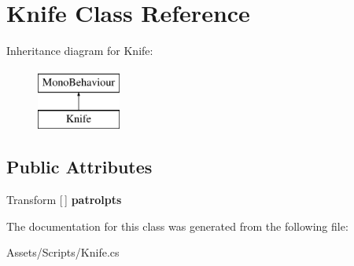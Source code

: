 \hypertarget{class_knife}{}\section{Knife Class Reference}
\label{class_knife}
Inheritance diagram for Knife\+:\begin{figure}[H]
\begin{center}
\leavevmode
\includegraphics[height=2.000000cm]{class_knife}
\end{center}
\end{figure}
\subsection*{Public Attributes}
\begin{DoxyCompactItemize}
\item 
\mbox{\label{class_knife_a65dd17ce14780f9c1ded8c122c04d13e}} 
Transform \mbox{[}$\,$\mbox{]} {\bfseries patrolpts}
\end{DoxyCompactItemize}


The documentation for this class was generated from the following file\+:\begin{DoxyCompactItemize}
\item 
Assets/\+Scripts/Knife.\+cs\end{DoxyCompactItemize}
